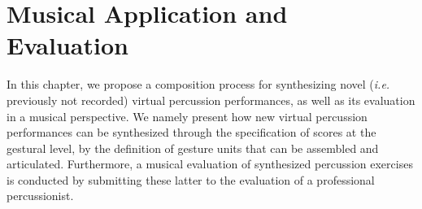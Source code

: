 \chapter{Musical Application and Evaluation}
\label{chapter:Application}





In this chapter, we propose a composition process for synthesizing novel (\emph{i.e.} previously not recorded) virtual percussion performances, as well as its evaluation in a musical perspective. We namely present how new virtual percussion performances can be synthesized through the specification of scores at the gestural level, by the definition of gesture units that can be assembled and articulated. Furthermore, a musical evaluation of synthesized percussion exercises is conducted by submitting these latter to the evaluation of a professional percussionist.\\

